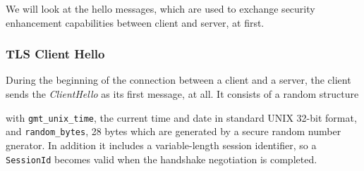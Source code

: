 \documentclass[sigconf, screen]{acmart}
\begin{document}

We will look at the hello messages, which are used to exchange security enhancement capabilities between client and server, at first.
\subsubsection{TLS Client Hello}
\label{sss:tlsclienthello}
During the beginning of the connection between a client and a server, the client sends the \textit{ClientHello} as its first message, at all. It consists of a random structure 

with \lstinline[language=C]{gmt_unix_time}, the current time and date in standard UNIX 32-bit format, and \lstinline[language=C]{random_bytes}, 28 bytes which are generated by a secure random number gnerator. In addition it includes a variable-length session identifier, so a \lstinline[language=C]{SessionId} becomes valid when the handshake negotiation is completed.
\end{document}

